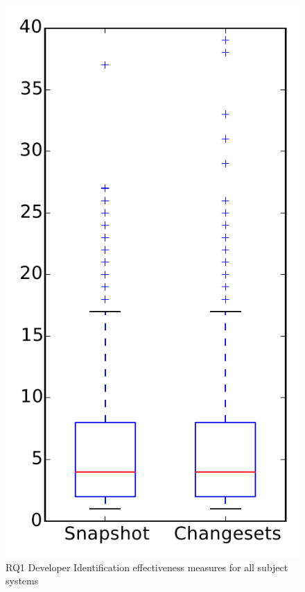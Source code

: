 
\begin{figure}
\centering
\includegraphics[height=0.4\textheight]{figures/dit/rq1_overview}
\caption{RQ1 Developer Identification effectiveness measures for all subject systems}
\label{fig:dit:rq1:overview}
\end{figure}

